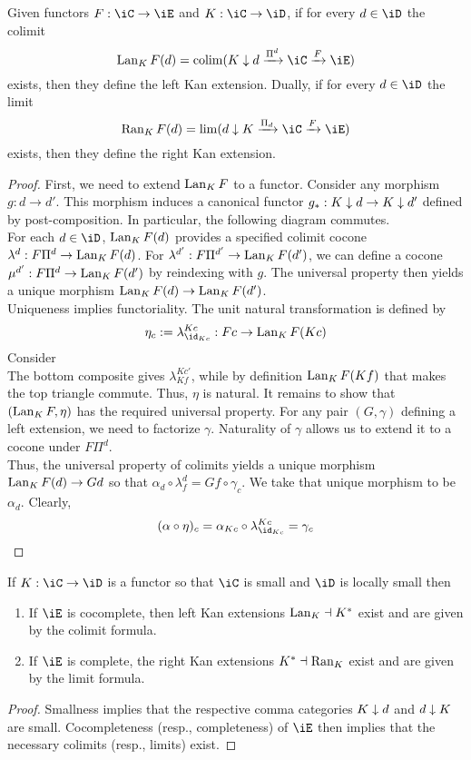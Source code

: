 \documentclass{amsart}
\begin{document}
\begin{prop}
  Given functors $F : \iC \to \iE$ and $K : \iC \to \iD$, if for every $d \in \iD$ the colimit
  \[
    \lan_{K}F(d) = \colim(\xMor{K \dn d}{\Pi^{d}}{\iC} \xMor{}{F}{\iE})
  \]
  exists, then they define the left Kan extension.
  Dually, if for every $d \in \iD$ the limit
  \[
    \ran_{K}F(d) = \lim(\xMor{d \dn K}{\Pi_{d}}{\iC} \xMor{}{F}{\iE})
  \]
  exists, then they define the right Kan extension.
\end{prop}
\begin{proof}
  First, we need to extend $\operatorname{Lan}_{K}F$ to a functor.
  Consider any morphism $g : d \to d'$.
  This morphism induces a canonical functor $g_{*} : K \downarrow d \to K \downarrow d'$ defined by post-composition.
  In particular, the following diagram commutes.
  \[\]
  For each $d \in \iD$, $\operatorname{Lan}_{K}F(d)$ provides a specified colimit cocone $\lambda^{d} : F\Pi^{d} \to \operatorname{Lan}_{K}F(d)$.
  For $\lambda^{d'} : F\Pi^{d'} \to \operatorname{Lan}_{K}F(d')$, we can define a cocone $\mu^{d'} : F\Pi^{d} \to \operatorname{Lan}_{K}F(d')$ by reindexing with $g$.
  The universal property then yields a unique morphism $\operatorname{Lan}_{K}F(d) \to \operatorname{Lan}_{K}F(d')$.
  \[\]
  Uniqueness implies functoriality.
  The unit natural transformation is defined by
  \[
    \eta_{c} := \lambda^{Kc}_{\id_{Kc}} : Fc \to \lan_{K}F(Kc)
  \]
  Consider
  \[\]
  The bottom composite gives $\lambda^{Kc'}_{Kf}$, while by definition $\operatorname{Lan}_{K}F(Kf)$ that makes the top triangle commute.
  Thus, $\eta$ is natural.
  It remains to show that $(\operatorname{Lan}_{K}F, \eta)$ has the required universal property.
  For any pair $(G, \gamma)$ defining a left extension, we need to factorize $\gamma$.
  Naturality of $\gamma$ allows us to extend it to a cocone under $F\Pi^{d}$.
  \[\]
  Thus, the universal property of colimits yields a unique morphism $\operatorname{Lan}_{K}F(d) \to Gd$ so that $\alpha_{d} \circ \lambda^{d}_{f} = Gf \circ \gamma_{c}$.
  We take that unique morphism to be $\alpha_{d}$.
  Clearly,
  \[
    (\alpha \circ \eta)_{c} = \alpha_{Kc} \circ \lambda^{Kc}_{\id_{Kc}} = \gamma_{c}
  \]
\end{proof}

\begin{cor}
  If $K : \iC \to \iD$ is a functor so that $\iC$ is small and $\iD$ is locally small then
  \begin{enumerate}
  \item If $\iE$ is cocomplete, then left Kan extensions $\operatorname{Lan}_{K} \dashv K^{*}$ exist and are given by the colimit formula.
  \item If $\iE$ is complete, the right Kan extensions $K^{*} \dashv \operatorname{Ran}_{K}$ exist and are given by the limit formula.
  \end{enumerate}
\end{cor}
\begin{proof}
  Smallness implies that the respective comma categories $K \downarrow d$ and $d \downarrow K$ are small.
  Cocompleteness (resp., completeness) of $\iE$ then implies that the necessary colimits (resp., limits) exist.
\end{proof}
\end{document}
